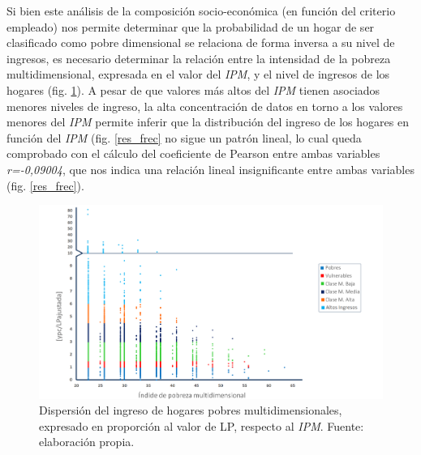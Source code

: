 \documentclass[12pt,letterpaper,spanish]{article}
\begin{document}
Si bien este análisis de la composición socio-económica (en función del criterio empleado) nos permite determinar que la probabilidad de un hogar de ser clasificado como pobre dimensional se relaciona de forma inversa a su nivel de ingresos, es necesario determinar la relación entre la intensidad de la pobreza multidimensional, expresada en el valor del \textit{IPM}, y el nivel de ingresos de los hogares (fig. \ref{scatter_general_quiebre}). A pesar de que valores más altos del \textit{IPM} tienen asociados menores niveles de ingreso, la alta concentración de datos en torno a los valores menores del \textit{IPM} permite inferir que la distribución del ingreso de los hogares en función del \textit{IPM} (fig. \ref{res_frec} no sigue un patrón lineal, lo cual queda comprobado con el cálculo del coeficiente de Pearson entre ambas variables \textit{r=-0,09004}, que nos indica una relación lineal insignificante entre ambas variables (fig. \ref{res_frec}).


\begin{figure}[!]
    \centering
    \includegraphics[width=\textwidth]{Max/scatter_General_quiebre.png}
    \caption{Dispersión del ingreso de hogares pobres multidimensionales, expresado en proporción al valor de LP, respecto al \textit{IPM}. Fuente: elaboración propia.}
    \label{scatter_general_quiebre}
\end{figure}
\end{document}
